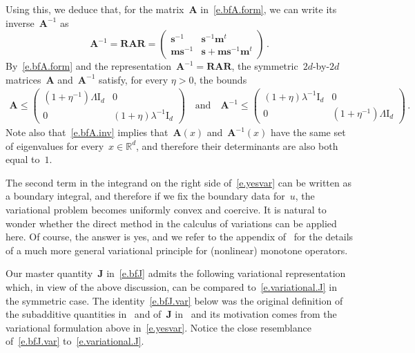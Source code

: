 \documentclass[11pt]{article} %
\numberwithin{equation}{section}
\theoremstyle{definition}
\newcommand*{\Id}{\ensuremath{\mathrm{I}_d}}
\newcommand*{\Rd}{\ensuremath{\mathbb{R}^d}}
\newcommand{\s}{\mathbf{s}}
\newcommand{\m}{\mathbf{m}}
\newcommand{\bfA}{\mathbf{A}}
\newcommand{\bfJ}{\mathbf{J}}
\newcommand{\rota}{\mathbf{R}}
\begin{document}
\smallskip

Using this, we deduce that, for the matrix~$\bfA$ in~\eqref{e.bfA.form}, we can write its inverse~$\bfA^{-1}$ as
\begin{equation}
\label{e.bfA.inv}
\bfA^{-1} 
=
\rota \bfA \rota
=
\begin{pmatrix} \s^{-1}  &   \s^{-1}\m^t \\ \m \s^{-1} & \s + \m\s^{-1}\m^t \end{pmatrix}
\,.
\end{equation}
By~\eqref{e.bfA.form} and the representation~$\bfA^{-1} = \rota \bfA \rota$, the symmetric~$2d$-by-$2d$ matrices~$\bfA$ and~$\bfA^{-1}$ satisfy, for every $\eta>0$, the bounds 
\begin{align}
\label{e.bfA.bounds}
\bfA
\leq 
\begin{pmatrix} (1{+}\eta^{-1}) \Lambda  \Id & 0 \\ 0 & (1{+}\eta) \lambda^{-1}  \Id \end{pmatrix}
\quad \mbox{and} \quad
\bfA^{-1}
\leq 
\begin{pmatrix} (1{+}\eta) \lambda^{-1}  \Id  & 0 \\ 0 & (1{+}\eta^{-1}) \Lambda  \Id \end{pmatrix}
\,.
\end{align}
Note also that~\eqref{e.bfA.inv} implies that~$\bfA(x)$ and~$\bfA^{-1}(x)$ have the same set of eigenvalues for every~$x\in\Rd$, and therefore their determinants are also both equal to~$1$.  

\smallskip
 
The second term in the integrand on the right side of~\eqref{e.yesvar} can be written as a boundary integral, and therefore if we fix the boundary data for~$u$, the variational problem becomes uniformly convex and coercive. 
It is natural to wonder whether the direct method in the calculus of variations can be applied here. Of course, the answer is yes, and we refer to the appendix of~\cite{AM} for the details of a much more general variational principle for (nonlinear) monotone operators. 

\smallskip

Our master quantity~$\bfJ$ in~\eqref{e.bfJ} admits the following variational representation which, in view of the above discussion, can be compared to~\eqref{e.variational.J} in the symmetric case. 
The identity~\eqref{e.bfJ.var} below was the original definition of the subadditive quantities in~\cite{AM} and of~$\bfJ$ in~\cite[Chapter 10]{AKMBook} and its motivation comes from the variational formulation above in~\eqref{e.yesvar}.
Notice the close resemblance of~\eqref{e.bfJ.var} to~\eqref{e.variational.J}. 
\end{document}
